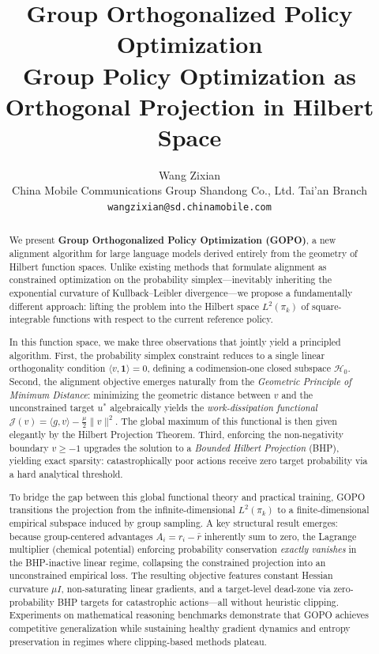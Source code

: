 \documentclass[11pt]{article}
\title{\textbf{Group Orthogonalized Policy Optimization}\\
\large Group Policy Optimization as Orthogonal Projection in Hilbert Space}
\author{Wang Zixian\\
\small China Mobile Communications Group Shandong Co., Ltd. Tai'an Branch\\
\small \texttt{wangzixian@sd.chinamobile.com}}
\date{}
\theoremstyle{definition}
\theoremstyle{remark}
\newcommand{\pik}{\pi_k}
\begin{document}
\maketitle

\begin{abstract}
We present \textbf{Group Orthogonalized Policy Optimization (GOPO)}, a new alignment algorithm for large language models derived entirely from the geometry of Hilbert function spaces. Unlike existing methods that formulate alignment as constrained optimization on the probability simplex---inevitably inheriting the exponential curvature of Kullback--Leibler divergence---we propose a fundamentally different approach: lifting the problem into the Hilbert space $L^2(\pik)$ of square-integrable functions with respect to the current reference policy.

In this function space, we make three observations that jointly yield a principled algorithm. First, the probability simplex constraint reduces to a single linear orthogonality condition $\langle v, \mathbf{1} \rangle = 0$, defining a codimension-one closed subspace $\mathcal{H}_0$. Second, the alignment objective emerges naturally from the \emph{Geometric Principle of Minimum Distance}: minimizing the geometric distance between $v$ and the unconstrained target $u^*$ algebraically yields the \emph{work-dissipation functional} $\mathcal{J}(v) = \langle g, v \rangle - \frac{\mu}{2}\|v\|^2$. The global maximum of this functional is then given elegantly by the Hilbert Projection Theorem. Third, enforcing the non-negativity boundary $v \geq -1$ upgrades the solution to a \emph{Bounded Hilbert Projection} (BHP), yielding exact sparsity: catastrophically poor actions receive zero target probability via a hard analytical threshold.

To bridge the gap between this global functional theory and practical training, GOPO transitions the projection from the infinite-dimensional $L^2(\pik)$ to a finite-dimensional empirical subspace induced by group sampling. A key structural result emerges: because group-centered advantages $A_i = r_i - \bar{r}$ inherently sum to zero, the Lagrange multiplier (chemical potential) enforcing probability conservation \emph{exactly vanishes} in the BHP-inactive linear regime, collapsing the constrained projection into an unconstrained empirical loss. The resulting objective features constant Hessian curvature $\mu I$, non-saturating linear gradients, and a target-level dead-zone via zero-probability BHP targets for catastrophic actions---all without heuristic clipping. Experiments on mathematical reasoning benchmarks demonstrate that GOPO achieves competitive generalization while sustaining healthy gradient dynamics and entropy preservation in regimes where clipping-based methods plateau.
\end{abstract}
\end{document}

